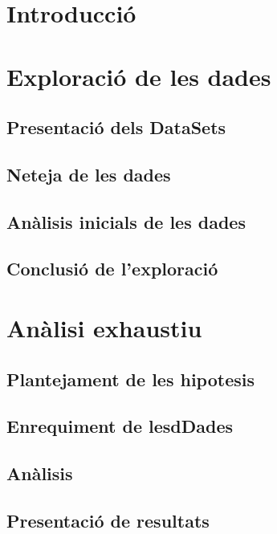 \tableofcontents

\newpage

\section{Introducció}

\newpage
\section{Exploració de les dades}

\subsection{Presentació dels DataSets}

\subsection{Neteja de les dades}

\subsection{Anàlisis inicials de les dades}

\subsection{Conclusió de l'exploració}



\newpage
\section{Anàlisi exhaustiu}

\subsection{Plantejament de les hipotesis}

\subsection{Enrequiment de lesdDades}

\subsection{Anàlisis}

\subsection{Presentació de resultats}


